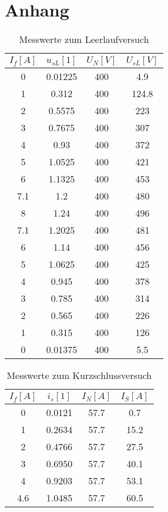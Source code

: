 \section{Anhang}
\begin{table}[!ht]
	\centering%
	\begin{tabular}{|c|c|c|c|}
	\hline
	$I_f [A]$ & $u_{sL} [1]$   & $U_N [V]$ & $U_{sL} [V]$ \\ \hline
	0    & 0.01225 & 400  & 4.9   \\ \hline
	1    & 0.312   & 400  & 124.8 \\ \hline
	2    & 0.5575  & 400  & 223   \\ \hline
	3    & 0.7675  & 400  & 307   \\ \hline
	4    & 0.93    & 400  & 372   \\ \hline
	5    & 1.0525  & 400  & 421   \\ \hline
	6    & 1.1325  & 400  & 453   \\ \hline
	7.1  & 1.2     & 400  & 480   \\ \hline
	8    & 1.24    & 400  & 496   \\ \hline\hline
	7.1  & 1.2025  & 400  & 481   \\ \hline
	6    & 1.14    & 400  & 456   \\ \hline
	5    & 1.0625  & 400  & 425   \\ \hline
	4    & 0.945   & 400  & 378   \\ \hline
	3    & 0.785   & 400  & 314   \\ \hline
	2    & 0.565   & 400  & 226   \\ \hline
	1    & 0.315   & 400  & 126   \\ \hline
	0    & 0.01375 & 400  & 5.5   \\ \hline
	\end{tabular}
    \caption{Messwerte zum Leerlaufversuch}
    \label{tab:SM_leerlauf}
\end{table}

\begin{table}[!ht]
\centering%
	\begin{tabular}{|c|c|c|c|}
	\hline
	$I_f [A]$ & $i_s [1]$& $I_N [A]$ & $I_S [A]$ \\ \hline
	0    & 0.0121 & 57.7 & 0.7  \\ \hline
	1    & 0.2634 & 57.7 & 15.2 \\ \hline
	2    & 0.4766 & 57.7 & 27.5 \\ \hline
	3    & 0.6950 & 57.7 & 40.1 \\ \hline
	4    & 0.9203 & 57.7 & 53.1 \\ \hline
	4.6  & 1.0485  & 57.7 & 60.5 \\ \hline
	\end{tabular}
    \caption{Messwerte zum Kurzschlussversuch}
    \label{tab:SM_kurzschluss}
\end{table}